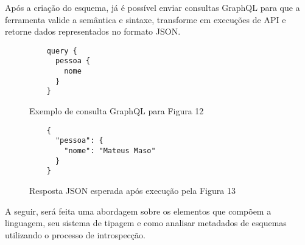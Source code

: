 Após a criação do esquema, já é possível enviar consultas GraphQL para que a ferramenta valide a semântica e sintaxe, transforme em execuções de API e retorne dados representados no formato JSON.  \cite{GraphQL2016}

\begin{figure}[H]
  \centering
  \begin{verbatim}
    query {
      pessoa {
        nome
      }
    }
  \end{verbatim}
  \caption{Exemplo de consulta GraphQL para Figura 12}
\end{figure}

\begin{figure}[H]
  \centering
  \begin{verbatim}
    {
      "pessoa": {
        "nome": "Mateus Maso"
      }
    }
  \end{verbatim}
  \caption{Resposta JSON esperada após execução pela Figura 13}
\end{figure}

A seguir, será feita uma abordagem sobre os elementos que compõem a linguagem, seu sistema de tipagem e como analisar metadados de esquemas utilizando o processo de introspecção.




